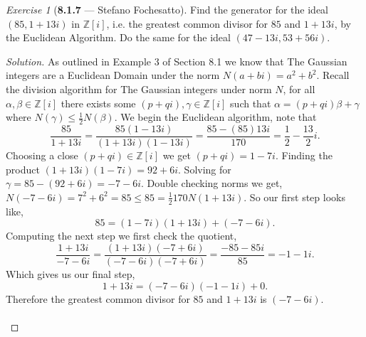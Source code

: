 \documentclass[12pt]{amsart}
\theoremstyle{remark}
\newtheorem*{exercise}{Exercise}%
\newcommand{\ZZ}{{\mathbb Z}}
\theoremstyle{mycomment}
\begin{document}
\begin{exercise}[\textbf{8.1.7} --- Stefano Fochesatto] Find the generator for the ideal $(85, 1 + 13i)$ in $\ZZ[i]$, i.e. the greatest common divisor for $85$
  and $1 + 13i$, by the Euclidean Algorithm. Do the same for the ideal $(47 - 13i, 53 + 56i)$.
    \begin{proof}[Solution] As outlined in Example $3$ of Section 8.1 we know that The Gaussian integers are a Euclidean Domain under the norm $N(a + bi) = a^2 + b^2$. 
      Recall the division algorithm for The Gaussian integers under norm $N$, for all $\alpha, \beta \in \ZZ[i]$ there exists some $(p + qi), \gamma \in \ZZ[i]$ such that 
      $\alpha = (p + qi)\beta + \gamma$ where $N(\gamma) \leq \frac{1}{2}N(\beta)$. 
      We begin the Euclidean algorithm, note that 
      \begin{equation*}
        \frac{85}{1 + 13i} = \frac{85(1 - 13i)}{(1 + 13i)(1 - 13i)} = \frac{85 - (85)13i}{170} = \frac{1}{2} - \frac{13}{2}i. 
      \end{equation*}
      Choosing a close $(p + qi) \in \ZZ[i]$ we get $(p + qi) = 1 - 7i$. Finding the product $(1 + 13i)(1 - 7i) = 92 + 6i$. Solving for $\gamma = 85 - (92 + 6i) = -7 - 6i$.
      Double checking norms we get, $N(-7 - 6i) = 7^2 + 6^2 = 85 \leq 85 = \frac{1}{2}170 N(1 + 13i)$. 
      So our first step looks like, 
      \begin{equation*}
        85 = (1 - 7i)(1 + 13i) + (-7 - 6i).
      \end{equation*}
      Computing the next step we first check the quotient,
      \begin{equation*}
        \frac{1 + 13i}{-7 - 6i} = \frac{(1 + 13i)(-7 + 6i)}{(-7 - 6i)(-7 + 6i)} = \frac{-85 - 85i}{85} = -1 - 1i.
      \end{equation*}
      Which gives us our final step, 
      \begin{equation*}
        1 + 13i = (-7 - 6i)(-1 - 1i) + 0.
      \end{equation*}
      Therefore the greatest common divisor for $85$ and $1 + 13i$ is $(-7 - 6i)$.\\\\


\end{proof}
\end{exercise}
\end{document}
